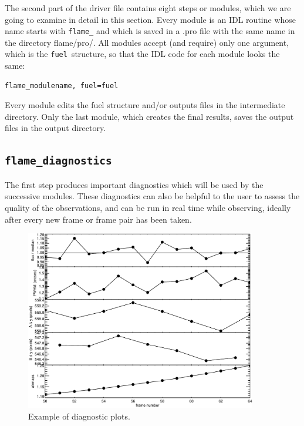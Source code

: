 \documentclass[a4paper, notitlepage]{article}
\newcommand{\fuel}{\texttt{fuel}}
\begin{document}
The second part of the driver file contains eight steps or modules, which we are going to examine in detail in this section. Every module is an IDL routine whose name starts with \texttt{flame\_} and which is saved in a .pro file with the same name in the directory flame/pro/. All modules accept (and require) only one argument, which is the \fuel\ structure, so that the IDL code for each module looks the same:
\begin{lstlisting}
flame_modulename, fuel=fuel
\end{lstlisting}

Every module edits the fuel structure and/or outputs files in the intermediate directory. Only the last module, which creates the final results, saves the output files in the output directory.



\subsection{\texttt{flame\_diagnostics}}
\label{sec:diagnostics}

The first step produces important diagnostics which will be used by the successive modules. These diagnostics can also be helpful to the user to assess the quality of the observations, and can be run in real time while observing, ideally after every new frame or frame pair has been taken.

\begin{figure}[htbp]
\centering
\includegraphics[width=0.9\textwidth]{diagnostics}
\caption{Example of diagnostic plots.}
\label{fig:diagnostics}
\end{figure}
\end{document}
